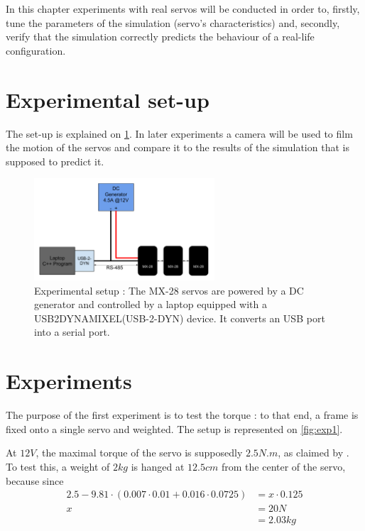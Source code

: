 In this chapter experiments with real servos will be conducted in order to, firstly, tune the parameters of the simulation (servo's characteristics) and, secondly, verify that the simulation correctly predicts the behaviour of a real-life configuration.

\section{Experimental set-up}
The set-up is explained on \cref{fig:exp_setup}. In later experiments a camera will be used to film the motion of the servos and compare it to the results of the simulation that is supposed to predict it.

\begin{figure}[htp]
\center
\includegraphics[width=0.6\textwidth]{figures/exp_setup}
\caption{Experimental setup : The MX-28 servos are powered by a DC generator and controlled by a laptop equipped with a USB2DYNAMIXEL(USB-2-DYN) device. It converts an USB port into a serial port.}
\label{fig:exp_setup}
\end{figure}

\section{Experiments}
The purpose of the first experiment is to test the torque : to that end, a frame is fixed onto a single servo and weighted. The setup is represented on \cref{fig:exp1}.

At $12V$, the maximal torque of the servo is supposedly $2.5N.m$, as claimed by \cite{mx_28_manual}. To test this, a weight of $2kg$ is hanged at $12.5cm$ from the center of the servo, because since 
\begin{align*}
2.5 - 9.81 \cdot (0.007 \cdot 0.01 + 0.016 \cdot 0.0725) &= x \cdot 0.125\\
x &= 20 N\\
&= 2.03 kg
\end{align*}

